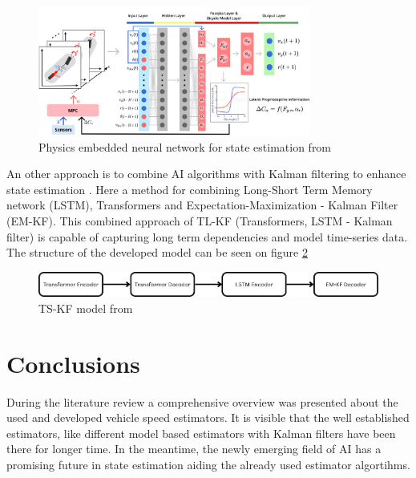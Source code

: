 \FloatBarrier
\begin{figure}[ht]
    \centering
    \includegraphics[width=0.8\textwidth]{images/physiscs_embedded_neural_network.png}
    \caption{Physics embedded neural network for state estimation from \cite{lit_ai_physiscs_embedded_neural_network}}
    \label{fig:physics_embedded_neural_network}
\end{figure}
\FloatBarrier

An other approach is to combine AI algorithms with Kalman filtering to enhance state estimation \cite{lit_trans_lstm}. Here a method for combining Long-Short Term Memory network (LSTM), Transformers and  Expectation-Maximization - Kalman Filter (EM-KF). This combined approach of TL-KF (Transformers, LSTM - Kalman filter) is capable of capturing long term dependencies and model time-series data. The structure of the developed model can be seen on figure \ref{fig:trans_lstm}
\FloatBarrier
\begin{figure}[ht]
    \centering
    \includegraphics[width=1\textwidth]{images/Transformer Encoder.png}
    \caption{TS-KF model from \cite{lit_trans_lstm}}
    \label{fig:trans_lstm}
\end{figure}
\FloatBarrier   

\section{Conclusions}
During the literature review a comprehensive overview was presented about the used and developed vehicle speed estimators. It is visible that the well established estimators, like different model based estimators with Kalman filters have been there for longer time. In the meantime, the newly emerging field of AI has a promising future in state estimation aiding the already used estimator algortihms. 